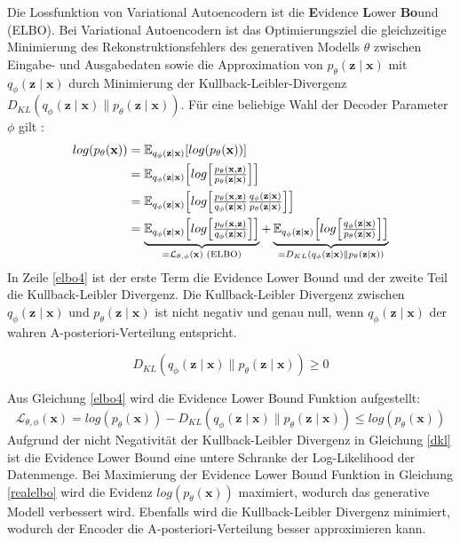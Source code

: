 \label{elbo}
Die Lossfunktion von Variational Autoencodern ist die \textbf{E}vidence \textbf{L}ower \textbf{Bo}und (ELBO).
Bei Variational Autoencodern ist das Optimierungsziel die gleichzeitige Minimierung des Rekonstruktionsfehlers des generativen Modells $\theta$ zwischen Eingabe- und Ausgabedaten sowie die Approximation von $p_\theta (\mathbf{z\mid x})$ mit $q_\phi (\mathbf{z\mid x})$ durch Minimierung der Kullback-Leibler-Divergenz$D_{KL}(q_\phi(\mathbf{z\mid x})\parallel p_\theta(\mathbf{z\mid x}))$.
Für eine beliebige Wahl der Decoder Parameter $\phi$ gilt \citep{introVAE}:
\begin{align}
    log(p_\theta(\mathbf{x})) &= \mathbb{E}_{ q_\phi(\mathbf{z\mid x}) } [log( p_\theta(\mathbf{x}) )] \\
    &= \mathbb{E}_{q_\phi( \mathbf{z\mid x} )} \Bigl[ log \Bigl[ \tfrac{ p_\theta(\mathbf{x,z}) }{ p_\theta(\mathbf{z \mid x}) } \Bigr] \Bigr] \\
    &= \mathbb{E}_{q_\phi( \mathbf{z\mid x} )} \Bigl[ log \Bigl[ \tfrac{ p_\theta(\mathbf{x,z}) }{ q_\phi( \mathbf{z\mid x} ) } \tfrac{ q_\phi( \mathbf{z\mid x} ) }{ p_\theta(\mathbf{z \mid x}) }\Bigr] \Bigr] \\
    &= \underbrace{\mathbb{E}_{q_\phi( \mathbf{z\mid x} )} \Bigl[ log \Bigl[ \tfrac{ p_\theta(\mathbf{x,z}) }{ q_\phi( \mathbf{z\mid x} ) } \Bigr] \Bigr]}_{=\mathcal{L}_{\theta,\phi}(\mathbf{x}) \text{ (ELBO)}} + \underbrace{\mathbb{E}_{q_\phi( \mathbf{z\mid x} )} \Bigl[ log \Bigl[ \tfrac{ q_\phi( \mathbf{z\mid x} ) }{ p_\theta(\mathbf{z \mid x}) }\Bigr] \Bigr]}_{=D_{KL}(q_\phi(\mathbf{z\mid x})\parallel p_\theta(\mathbf{z\mid x}))} \label{elbo4}
\end{align}
In Zeile \ref{elbo4} ist der erste Term die Evidence Lower Bound und der zweite Teil die Kullback-Leibler Divergenz.
Die Kullback-Leibler Divergenz zwischen $q_\phi(\mathbf{z\mid x})$ und $p_\theta(\mathbf{z\mid x})$ ist nicht negativ und genau null, wenn $q_\phi(\mathbf{z\mid x})$ der wahren A-posteriori-Verteilung entspricht.

\begin{equation}
    \label{dkl}
    D_{KL}(q_\phi(\mathbf{z\mid x})\parallel p_\theta(\mathbf{z\mid x})) \geq 0
\end{equation}

Aus Gleichung \ref{elbo4} wird die Evidence Lower Bound Funktion aufgestellt:
\begin{equation}
    \label{realelbo}
    \mathcal{L}_{\theta,\phi}(\mathbf{x}) = log(p_\theta(\mathbf{x})) - D_{KL}(q_\phi(\mathbf{z\mid x})\parallel p_\theta(\mathbf{z\mid x})) \leq log(p_\theta(\mathbf{x})) 
\end{equation}
Aufgrund der nicht Negativität der Kullback-Leibler Divergenz in Gleichung \ref{dkl} ist die Evidence Lower Bound eine untere Schranke der Log-Likelihood der Datenmenge.
Bei Maximierung der Evidence Lower Bound Funktion in Gleichung \ref{realelbo} wird die Evidenz $log(p_\theta(\mathbf{x}))$ maximiert, wodurch das generative Modell verbessert wird. Ebenfalls wird die Kullback-Leibler Divergenz minimiert, wodurch der Encoder die A-posteriori-Verteilung besser approximieren kann.

